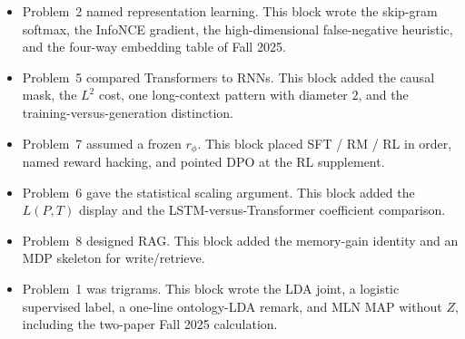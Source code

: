 \begin{summary}
\label{sum:nlpu}
\begin{itemize}
    \item Problem~2 named representation learning. This block wrote the skip-gram softmax, the InfoNCE gradient, the high-dimensional false-negative heuristic, and the four-way embedding table of Fall 2025.
    \item Problem~5 compared Transformers to RNNs. This block added the causal mask, the $L^2$ cost, one long-context pattern with diameter $2$, and the training-versus-generation distinction.
    \item Problem~7 assumed a frozen $r_\phi$. This block placed SFT / RM / RL in order, named reward hacking, and pointed DPO at the RL supplement.
    \item Problem~6 gave the statistical scaling argument. This block added the $L(P,T)$ display and the LSTM-versus-Transformer coefficient comparison.
    \item Problem~8 designed RAG. This block added the memory-gain identity and an MDP skeleton for write/retrieve.
    \item Problem~1 was trigrams. This block wrote the LDA joint, a logistic supervised label, a one-line ontology-LDA remark, and MLN MAP without $Z$, including the two-paper Fall 2025 calculation.
\end{itemize}
\end{summary}
